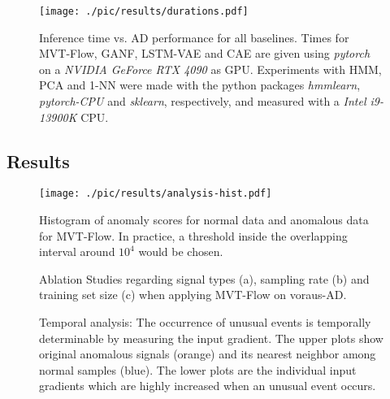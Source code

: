 \documentclass[journal]{IEEEtran}
\newcommand\datasetname{voraus-AD}
\begin{document}
\label{results}

\begin{figure}\centering
    \texttt{[image: ./pic/results/durations.pdf]}
    \caption{Inference time vs. AD performance for all baselines. {Times for MVT-Flow, GANF, LSTM-VAE and CAE are given using \textit{pytorch} on a \textit{NVIDIA GeForce RTX 4090} as GPU.
     Experiments with HMM, PCA and 1-NN were made with the python packages \textit{hmmlearn}, \textit{pytorch-CPU} and \textit{sklearn}, respectively, and measured with a \textit{Intel i9-13900K} CPU.}}
    \label{fig:durations}
    
\end{figure}
\subsection{Results}
\begin{figure}\centering
    \texttt{[image: ./pic/results/analysis-hist.pdf]}
    \caption{Histogram of anomaly scores for normal data and anomalous data for MVT-Flow. In practice, a threshold inside the overlapping interval around $10^4$ would be chosen.}
    \label{fig:score_distribution}
    \vspace{-3mm}
\end{figure}
\newcommand\ablStudWidth{0.30}

\begin{figure*}[b]
  \centering
  

  \caption{Ablation Studies regarding signal types (a), sampling rate (b) and training set size (c) when applying MVT-Flow on \datasetname{}.}
  \label{fig:ablation}
    \vspace{-6mm}
\end{figure*}


\begin{figure*}[b]
    \centering
    \caption{Temporal analysis: The occurrence of unusual events is temporally determinable by measuring the input gradient. The upper plots show original anomalous signals (orange) and its nearest neighbor among normal samples (blue). The lower plots are the individual input gradients which are highly increased when an unusual event occurs.}
    \label{fig:temp_analysis}
\end{figure*}
\end{document}

